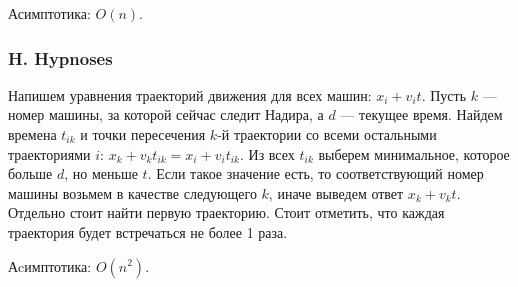 Асимптотика: $O(n)$.


\subsubsection*{H. Hypnoses}


Напишем уравнения траекторий движения для всех машин: $x_i + v_i t$. Пусть $k$ --- номер машины, за которой сейчас следит Надира, а $d$ --- текущее время. Найдем времена $t_{ik}$ и точки пересечения $k$-й траектории со всеми остальными траекториями $i$: $x_k + v_k t_{ik} = x_i + v_i t_{ik}$. Из всех $t_{ik}$ выберем минимальное, которое больше $d$, но меньше $t$. Если такое значение есть, то соответствующий номер машины возьмем в качестве следующего $k$, иначе выведем ответ $x_k + v_k t$. Отдельно стоит найти первую траекторию. Стоит отметить, что каждая траектория будет встречаться не более 1 раза.

Аcимптотика: $O(n^2)$.